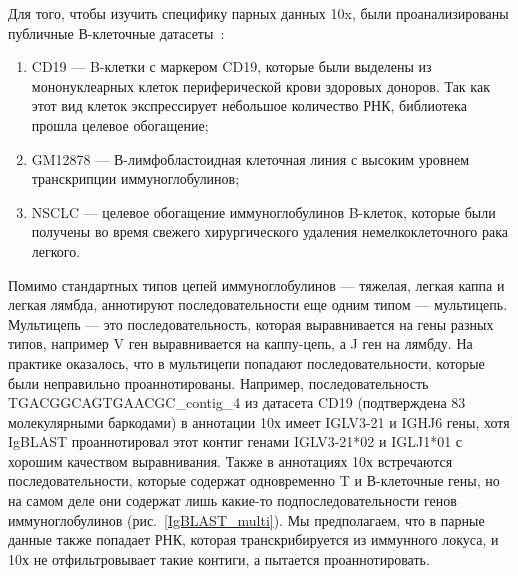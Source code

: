 \documentclass{spbau-diploma}
\begin{document}
Для того, чтобы изучить специфику парных данных 10x, были проанализированы публичные В-клеточные датасеты~\cite{10x_datasets}: 
\begin{enumerate}
    \item CD19 --- B-клетки с маркером CD19, которые были выделены из мононуклеарных клеток периферической крови здоровых доноров. Так как этот вид клеток экспрессирует небольшое количество РНК, библиотека прошла целевое обогащение;
    \item GM12878 --- В-лимфобластоидная клеточная линия с высоким уровнем транскрипции иммуноглобулинов;
    \item NSCLC --- целевое обогащение иммуноглобулинов B-клеток, которые были получены во время свежего хирургического удаления немелкоклеточного рака легкого.
\end{enumerate}

Помимо стандартных типов цепей иммуноглобулинов --- тяжелая, легкая каппа и легкая лямбда, аннотируют последовательности еще одним типом --- мультицепь. Мультицепь --- это последовательность, которая выравнивается на гены разных типов, например V ген выравнивается на каппу-цепь, а J ген на лямбду. На практике оказалось, что в мультицепи попадают последовательности, которые были неправильно проаннотированы. Например, последовательность TGACGGCAGTGAACGC\_contig\_4 из датасета CD19 (подтверждена $83$ молекулярными баркодами) в аннотации 10х имеет IGLV3-21 и IGHJ6 гены, хотя IgBLAST проаннотировал этот контиг генами IGLV3-21*02 и IGLJ1*01 с хорошим качеством выравнивания. Также в аннотациях 10х встречаются последовательности, которые содержат одновременно T и В-клеточные гены, но на самом деле они содержат лишь какие-то подпоследовательности генов иммуноглобулинов (рис.~\ref{IgBLAST_multi}). Мы предполагаем, что в парные данные также попадает РНК, которая транскрибируется из иммунного локуса, и 10х не отфильтровывает такие контиги, а пытается проаннотировать. 
\end{document}
